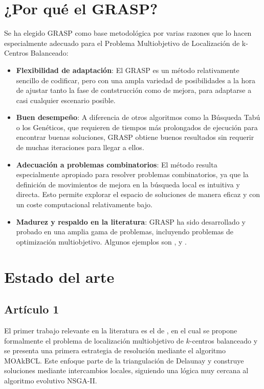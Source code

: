 \documentclass[12pt,a4paper]{book}
\begin{document}
\section{¿Por qué el GRASP?}
Se ha elegido GRASP como base metodológica por varias razones que lo hacen especialmente adecuado para el Problema Multiobjetivo de Localización de k-Centros Balanceado:
\begin{itemize}
    \item \textbf{Flexibilidad de adaptación}: El GRASP es un método relativamente sencillo de codificar, pero con una ampla variedad de posibilidades
    a la hora de ajustar tanto la fase de contstrucción como de mejora, para adaptarse a casi cualquier escenario posible. 
    \item \textbf{Buen desempeño}: A diferencia de otros algoritmos como la Búsqueda Tabú o los Genéticos, que requieren de tiempos más prolongados de ejecución para encontrar buenas soluciones,
    GRASP obtiene buenos resultados sin requerir de muchas iteraciones para llegar a ellos.
    \item \textbf{Adecuación a problemas combinatorios}: El método resulta especialmente apropiado para resolver problemas combinatorios, ya que la definición de movimientos de mejora en la búsqueda local es intuitiva y directa.
    Esto permite explorar el espacio de soluciones de manera eficaz y con un coste computacional relativamente bajo.
    \item \textbf{Madurez y respaldo en la literatura}: GRASP ha sido desarrollado y probado en una amplia gama de problemas, incluyendo problemas de optimización multiobjetivo. Algunos ejemplos son \cite{grasp_1}, \cite{grasp_3} y \cite{grasp_2}. 
\end{itemize}

\section{Estado del arte}

\subsection{Artículo 1}
El primer trabajo relevante en la literatura es el de \cite{k-balanced_1}, en el cual se propone formalmente el problema de localización multiobjetivo de $k$-centros balanceado y se presenta una primera estrategia de resolución mediante el algoritmo MOAkBCL.
Este enfoque parte de la triangulación de Delaunay \citep{delaunay} y construye soluciones mediante intercambios locales, siguiendo una lógica muy cercana al algoritmo evolutivo NSGA-II.
\end{document}
